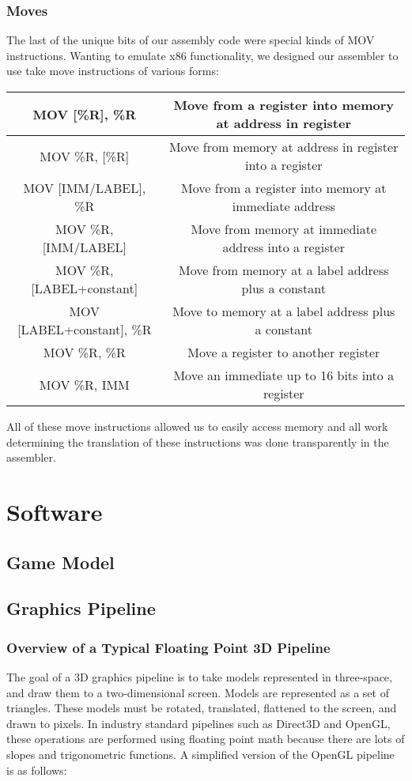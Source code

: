 \documentclass[onecolumn]{IEEEtran}
\begin{document}
\subsubsection{Moves}
The last of the unique bits of our assembly code were special kinds of MOV instructions.  Wanting to emulate x86 functionality, we designed our assembler to use take move instructions of various forms: 

\begin{table}
\centering
\label{tab:moveTypes}
\begin{tabular}{|c|c|}
\hline 
MOV [\%R], \%R & Move from a register into memory at address in register \\ 
\hline 
MOV \%R, [\%R] & Move from memory at address in register into a register \\ 
\hline 
MOV [IMM/LABEL], \%R & Move from a register into memory at immediate address \\ 
\hline 
MOV \%R, [IMM/LABEL] & Move from memory at immediate address into a register \\ 
\hline 
MOV \%R, [LABEL+constant] & Move from memory at a label address plus a constant \\ 
\hline 
MOV [LABEL+constant], \%R & Move to memory at a label address plus a constant \\ 
\hline 
MOV \%R, \%R & Move a register to another register \\ 
\hline 
MOV \%R, IMM & Move an immediate up to 16 bits into a register \\ 
\hline 
\end{tabular}
\end{table}

All of these move instructions allowed us to easily access memory and all work determining the translation of these instructions was done transparently in the assembler.

\section{Software}
\subsection{Game Model}

\subsection{Graphics Pipeline}
\subsubsection{Overview of a Typical Floating Point 3D Pipeline}
  The goal of a 3D graphics pipeline is to take models represented in three-space, and draw them to a two-dimensional screen.  Models are represented as a set of triangles.  These models must be rotated, translated, flattened to the screen, and drawn to pixels.  In industry standard pipelines such as Direct3D and OpenGL, these operations are performed using floating point math because there are lots of slopes and trigonometric functions.  A simplified version of the OpenGL pipeline is as follows:
\end{document}
